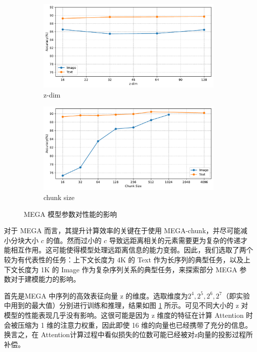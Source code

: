 \begin{figure}[htbp]
\centering

\begin{subfigure}[b]{0.45\textwidth}
\centering
\includegraphics[width=\textwidth]{figs/mega/mega_z.pdf}
\caption{z-dim}
\label{fig:mega_z}
\end{subfigure}
\hspace{0.05\textwidth}
\begin{subfigure}[b]{0.45\textwidth}
\centering
\includegraphics[width=\textwidth]{figs/mega/mega_chunk.pdf}
\caption{chunk size}
\label{fig:mega_chunk}
\end{subfigure}

\caption{MEGA 模型参数对性能的影响}
\label{fig:mega_param}
\end{figure}

对于 MEGA 而言，其提升计算效率的关键在于使用 MEGA-chunk，并尽可能减小分块大小 $c$ 的值。然而过小的 $c$ 导致远距离相关的元素需要更为复杂的传递才能相互作用。这可能使得模型处理远距离信息的能力变弱。因此，我们选取了两个较为有代表性的任务：上下文长度为 4K 的 Text 作为长序列的典型任务，以及上下文长度为 1K 的 Image 作为复杂序列关系的典型任务，来探索部分 MEGA 参数对于建模能力的影响。

首先是MEGA 中序列的高效表征向量 z 的维度。选取维度为$2^4,2^5,2^6,2^7$（即实验中用到的最大值）分别进行训练和推理，结果如图 \ref{fig:mega_z} 所示。可见不同大小的 z 对模型的性能表现几乎没有影响。这很可能是因为 z 维度的特征在计算 Attention 时会被压缩为 1 维的注意力权重，因此即使 16 维的向量也已经携带了充分的信息。换言之，在 Attention计算过程中看似损失的位数可能已经被对z向量的投影过程所补偿。

